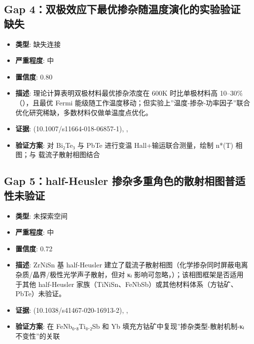 \documentclass[12pt,a4paper]{ctexart}
\providecommand{\tightlist}{%
  \setlength{\itemsep}{0pt}\setlength{\parskip}{0pt}}
\begin{document}
\subsection{Gap 4：双极效应下最优掺杂随温度演化的实验验证缺失}\label{gap:gap-4ux53ccux6781ux6548ux5e94ux4e0bux6700ux4f18ux63baux6742ux968fux6e29ux5ea6ux6f14ux5316ux7684ux5b9eux9a8cux9a8cux8bc1ux7f3aux5931}

\begin{itemize}
\tightlist
\item
  \textbf{类型}: 缺失连接
\item
  \textbf{严重程度}: 中
\item
  \textbf{置信度}: 0.80
\item
  \textbf{描述}: 理论计算表明双极材料最优掺杂浓度在 600K 时比单极材料高 10--30\%（\cite{TE082}），且最优 Fermi 能级随工作温度移动；但实验上''温度-掺杂-功率因子''联合优化研究稀缺，多数材料仅做单温度点优化。
\item
  \textbf{证据}: \cite{TE082} (10.1007/s11664-018-06857-1), \cite{TE085}, \cite{TE090}
\item
  \textbf{验证方案}: 对 Bi₂Te₃ 与 PbTe 进行变温 Hall+输运联合测量，绘制 n*(T) 相图；与 \cite{TE136} 载流子散射相图结合
\end{itemize}

\subsection{Gap 5：half-Heusler 掺杂多重角色的散射相图普适性未验证}\label{gap:gap-5half-heusler-ux63baux6742ux591aux91cdux89d2ux8272ux7684ux6563ux5c04ux76f8ux56feux666eux9002ux6027ux672aux9a8cux8bc1}

\begin{itemize}
\tightlist
\item
  \textbf{类型}: 未探索空间
\item
  \textbf{严重程度}: 中
\item
  \textbf{置信度}: 0.72
\item
  \textbf{描述}: ZrNiSn 基 half-Heusler 建立了载流子散射相图（化学掺杂同时屏蔽电离杂质/晶界/极性光学声子散射，但对 κₗ 影响可忽略，\cite{TE136}）；该相图框架是否适用于其他 half-Heusler 家族（TiNiSn、FeNbSb）或其他材料体系（方钴矿、PbTe）未验证。
\item
  \textbf{证据}: \cite{TE136} (10.1038/s41467-020-16913-2), \cite{TE146}, \cite{TE200}
\item
  \textbf{验证方案}: 在 FeNb₀.₈Ti₀.₂Sb 和 Yb 填充方钴矿中复现''掺杂类型-散射机制-κₗ不变性''的关联
\end{itemize}
\end{document}
